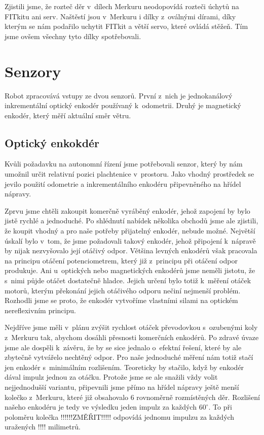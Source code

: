 Zjistili jsme, že rozteč děr v~dílech Merkuru neodopovídá rozteči úchytů na FITkitu ani serv. Naštěstí jsou v~Merkuru i dílky z~oválnými dírami, díky kterým se nám podařilo uchytit FITkit a větší servo, které ovládá stěžeň. Tím jsme ovšem všechny tyto dílky spotřebovali. 

\section{Senzory}
Robot zpracovává vstupy ze dvou senzorů. První z~nich je jednokanálový inkrementální optický enkodér používaný k~odometrii. Druhý je magnetický enkodér, který měří aktuální směr větru.

\subsection{Optický enkokdér}
Kvůli požadavku na autonomní řízení jsme potřebovali senzor, který by nám umožnil určit relativní pozici plachtenice v~prostoru. Jako vhodný prostředek se jevilo použití odometrie a inkrementálního enkodéru připevněného na hřídel nápravy. 

Zprvu jsme chtěli zakoupit komerčně vyráběný enkodér, jehož zapojení by bylo jistě rychlé a jednoduché. Po shlédnutí nabídek několika obchodů jsme ale zjistili, že koupit vhodný a pro naše potřeby přijatelný enkodér, nebude možné. Největší úskalí bylo v~tom, že jsme požadovali takový enkodér, jehož připojení k~nápravě by nijak nezvyšovalo její otáčivý odpor. Většina levných enkodérů však pracovala na principu otáčení potenciometrem, který již z~principu při otáčení odpor produkuje. Ani u~optických nebo magnetických enkodérů jsme neměli jistotu, že s~nimi půjde otáčet dostatečně hladce. Jejich určení bylo totiž k~měření otáček motorů, kterým překonání jejich otáčivého odporu nečiní nejmenší problém. Rozhodli jsme se proto, že enkodér vytvoříme vlastními silami na optickém nereflexivním principu.

Nejdříve jsme měli v~plánu zvýšit rychlost otáček převodovkou s~ozubenými koly z~Merkuru tak, abychom dosáhli přesnosti komerčních enkodérů. Po zdravé úvaze jsme ale dospěli k~závěru, že by se sice jednalo o~efektní řešení, které by ale zbytečně vytvářelo nechtěný odpor. Pro naše jednoduché měření nám totiž stačí jen enkodér s~minimálním rozlišením. Teoreticky by stačilo, když by enkodér dával impulz jednou za otáčku. Protože jsme se ale snažili vždy volit nejjednodušší variantu, připevnili jsme přímo na hřídel nápravy ještě menší kolečko z~Merkuru, které již obsahovalo 6 rovnoměrně rozmístěných děr. Rozlišení našeho enkodéru je tedy ve výsledku jeden impulz za každých $60^\circ$. To při poloměru kolečka !!!!!!ZMĚŘIT!!!!! odpovídá jednomu impulzu za každých uražených !!!! milimetrů.

